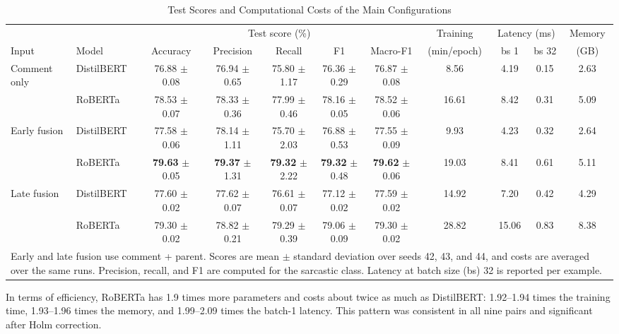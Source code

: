 \documentclass[conference]{IEEEtran}
\begin{document}
\begin{table}[t]
\caption{Test Scores and Computational Costs of the Main Configurations}
\label{tab:main}
\centering
\footnotesize
\setlength{\tabcolsep}{3pt}
\begin{tabular}{llccccccccc}
\hline
 & & \multicolumn{5}{c}{Test score (\%)} & Training & \multicolumn{2}{c}{Latency (ms)} & Memory \\
Input & Model & Accuracy & Precision & Recall & F1 & Macro-F1 & (min/epoch) & bs 1 & bs 32 & (GB) \\
\hline
Comment only & DistilBERT & 76.88 $\pm$ 0.08 & 76.94 $\pm$ 0.65 & 75.80 $\pm$ 1.17 & 76.36 $\pm$ 0.29 & 76.87 $\pm$ 0.08 & 8.56 & 4.19 & 0.15 & 2.63 \\
 & RoBERTa & 78.53 $\pm$ 0.07 & 78.33 $\pm$ 0.36 & 77.99 $\pm$ 0.46 & 78.16 $\pm$ 0.05 & 78.52 $\pm$ 0.06 & 16.61 & 8.42 & 0.31 & 5.09 \\
Early fusion & DistilBERT & 77.58 $\pm$ 0.06 & 78.14 $\pm$ 1.11 & 75.70 $\pm$ 2.03 & 76.88 $\pm$ 0.53 & 77.55 $\pm$ 0.09 & 9.93 & 4.23 & 0.32 & 2.64 \\
 & RoBERTa & \textbf{79.63} $\pm$ 0.05 & \textbf{79.37} $\pm$ 1.31 & \textbf{79.32} $\pm$ 2.22 & \textbf{79.32} $\pm$ 0.48 & \textbf{79.62} $\pm$ 0.06 & 19.03 & 8.41 & 0.61 & 5.11 \\
Late fusion & DistilBERT & 77.60 $\pm$ 0.02 & 77.62 $\pm$ 0.07 & 76.61 $\pm$ 0.07 & 77.12 $\pm$ 0.02 & 77.59 $\pm$ 0.02 & 14.92 & 7.20 & 0.42 & 4.29 \\
 & RoBERTa & 79.30 $\pm$ 0.02 & 78.82 $\pm$ 0.21 & 79.29 $\pm$ 0.39 & 79.06 $\pm$ 0.09 & 79.30 $\pm$ 0.02 & 28.82 & 15.06 & 0.83 & 8.38 \\
\hline
\multicolumn{11}{p{0.97\textwidth}}{Early and late fusion use comment + parent. Scores are mean $\pm$ standard deviation over seeds 42, 43, and 44, and costs are averaged over the same runs. Precision, recall, and F1 are computed for the sarcastic class. Latency at batch size (bs) 32 is reported per example.}
\end{tabular}
\end{table}

In terms of efficiency, RoBERTa has 1.9 times more parameters and costs about twice as much as DistilBERT: 1.92--1.94 times the training time, 1.93--1.96 times the memory, and 1.99--2.09 times the batch-1 latency. This pattern was consistent in all nine pairs and significant after Holm correction.
\end{document}
